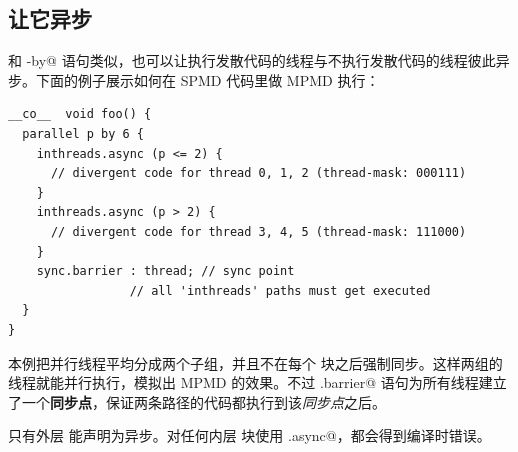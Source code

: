 \subsection*{让它异步}

和 \co@parallel-by@ 语句类似，也可以让执行发散代码的线程与不执行发散代码的线程彼此异步。下面的例子展示如何在 SPMD 代码里做 MPMD 执行：

\begin{lstlisting}[language=croqtile,caption={让它异步}]
__co__  void foo() {
  parallel p by 6 {
    inthreads.async (p <= 2) {
      // divergent code for thread 0, 1, 2 (thread-mask: 000111)
    }
    inthreads.async (p > 2) {
      // divergent code for thread 3, 4, 5 (thread-mask: 111000)
    }
    sync.barrier : thread; // sync point
                 // all 'inthreads' paths must get executed
  }
}
\end{lstlisting}

本例把并行线程平均分成两个子组，并且不在每个 \co@inthreads@ 块之后强制同步。这样两组的线程就能并行执行，模拟出 MPMD 的效果。不过 \co@sync.barrier@ 语句为所有线程建立了一个\textbf{同步点}，保证两条路径的代码都执行到该\emph{同步点}之后。

只有外层 \co@inthreads@ 能声明为异步。对任何内层 \co@inthreads@ 块使用 \co@inthreads.async@，都会得到编译时错误。
